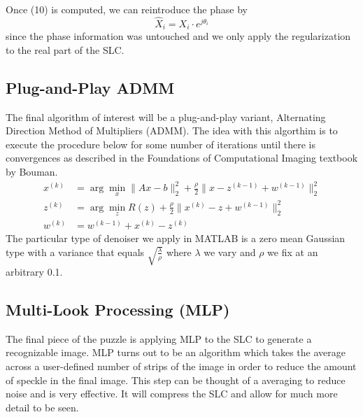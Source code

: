 \documentclass[conference]{IEEEtran}
\begin{document}
Once (10) is computed, we can reintroduce the phase by 
\begin{equation}
\hat{X}_{i} = X_i \cdot e^{j\theta_i}
\end{equation}
since the phase information was untouched and we only apply the regularization to the real part of the SLC.
\subsection{Plug-and-Play ADMM}
\par The final algorithm of interest will be a plug-and-play variant, Alternating Direction Method of Multipliers (ADMM). The idea with this algorthim is to execute the procedure below for some number of iterations until there is convergences as described in the Foundations of Computational Imaging textbook by Bouman\cite{b6}. 
\begin{equation}
    \begin{aligned}
x^{(k)} &= \arg \min_x \| Ax - b \|_2^2 + \frac{\rho}{2} \| x - z^{(k-1)} + w^{(k-1)} \|_2^2 \\
z^{(k)} &= \arg \min_z R(z) + \frac{\rho}{2} \| x^{(k)} - z + w^{(k-1)} \|_2^2 \\
w^{(k)} &= w^{(k-1)} + x^{(k)} - z^{(k)}
\end{aligned}
\end{equation}
The particular type of denoiser we apply in MATLAB is a zero mean Gaussian type with a variance that equals $\sqrt{\frac{\lambda}{\rho}}$ where $\lambda$ we vary and $\rho$ we fix at an arbitrary 0.1.

\subsection{Multi-Look Processing (MLP)}
\par The final piece of the puzzle is applying MLP to the SLC to generate a recognizable image. MLP turns out to be an algorithm which takes the average across a user-defined number of strips of the image in order to reduce the amount of speckle in the final image\cite{sarIntro}. This step can be thought of a averaging to reduce noise and is very effective. It will compress the SLC and allow for much more detail to be seen.
\end{document}
